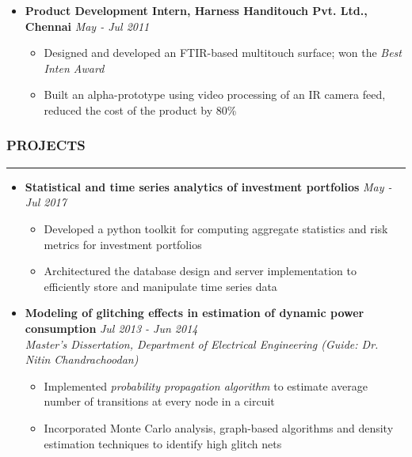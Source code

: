 \documentclass[10pt,a4paper,English]{article}
\newcommand\roottitle[1]{\vspace{-4mm}\subsubsection*{\uppercase{#1}}\vspace{-0.3em}\nopagebreak[4]\hrule\vspace{4mm}}
\newcommand\itemyear[1]{\hfill \emph{\color{itemyear} #1}}
\newcommand\itemenv{\setlength\itemsep{0.5pt} \addtolength{\itemindent}{-5mm}\vspace{-1.5mm}}
\begin{document}
\begin{itemize}
    \item \textbf{Product Development Intern, Harness Handitouch Pvt. Ltd., Chennai} \itemyear{May - Jul 2011}
        \begin{itemize} \itemenv
            \item Designed and developed an FTIR-based multitouch surface; won the \textit{Best Inten Award}
            \item Built an alpha-prototype using video processing of an IR camera feed, reduced the cost of the product by 80\%
        \end{itemize}

    \end{itemize}

\roottitle{Projects}
\begin{itemize} \itemenv
    \item \textbf{Statistical and time series analytics of investment portfolios} \itemyear{May - Jul 2017}
        \begin{itemize} \itemenv
            \item Developed a python toolkit for computing aggregate statistics and risk metrics for investment portfolios
            \item Architectured the database design and server implementation to efficiently store and manipulate time series data
        \end{itemize}
    \item \textbf{Modeling of glitching effects in estimation of dynamic power consumption} \itemyear{Jul 2013 - Jun 2014} \\
    \emph{Master's Dissertation, Department of Electrical Engineering (Guide: Dr. Nitin Chandrachoodan)}
        \begin{itemize} \itemenv
            \item Implemented \textit{probability propagation algorithm} to estimate average number of transitions at every node in a circuit
            \item Incorporated Monte Carlo analysis, graph-based algorithms and density estimation techniques to identify high glitch nets
        \end{itemize}
\end{itemize}
\end{document}
